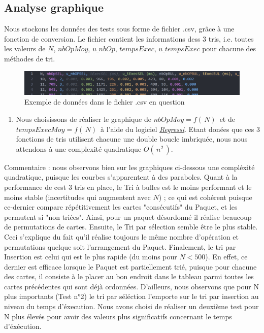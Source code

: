 \documentclass{report}
\begin{document}
\subsection{Analyse graphique}

\qquad Nous stockons les données des tests sous forme de fichier .csv, grâce à une fonction de conversion. Le fichier contient les informations dess 3 tris, i.e. toutes les valeurs de $N$, $nbOpMoy$, $u\_nbOp$, $tempsExec$, $u\_tempsExec$ pour chacune des méthodes de tri. 

\begin{figure}[H]
	\includegraphics[width=\textwidth]{../graphe/csvEx.png}
	\caption{Exemple de données dans le fichier .csv en question}
\end{figure}

\begin{enumerate}
	\item[\fcolorbox{black}{black}{\textbf{\textcolor{white}{3}}}] 
	Nous choisissons de réaliser le graphique de $nbOpMoy=f(\,N)\,$ et de $tempsExecMoy=f(\,N)\,$ à l'aide du logiciel \href{https://regressi.fr/WordPress/}{\it \underline{Regressi}}. Etant donées que ces 3 fonctions de tris utilisent chacune une double boucle imbriquée, nous nous attendons à une complexité quadratique $O(\,n^2\,)$.
\end{enumerate}
Commentaire : nous observons bien sur les graphiques ci-dessous une compléxité quadratique, puisque les courbes s'apparentent à des paraboles. Quant à la performance de cest 3 tris en place, le Tri à bulles est le moins performant et le moins stable (incertitudes qui augmentent avec $N$) ; ce qui est cohérent puisque ce-dernier compare répétitivement les cartes "consécutifs" du Paquet, et les permutent si "non triées". Ainsi, pour un paquet désordonné il réalise beaucoup de permutations de cartes. Ensuite, le Tri par sélection semble être le plus stable. Ceci s'explique du fait qu'il réalise toujours le même nombre d'opération et permutations quelque soit l'arrangement du Paquet. Finalement, le tri par Insertion est celui qui est le plus rapide (du moins pour $N<500$). En effet, ce dernier est efficace lorsque le Paquet est partiellement trié, puisque pour chacune des cartes, il consiste à le placer au bon endroit dans le tableau parmi toutes les cartes précédentes qui sont déjà ordonnées. D'ailleurs, nous observons que pour N plus importants (Test n°2) le tri par séléction l'emporte sur  le tri par insertion au niveau du temps d'éxecution. Nous avons choisi de réaliser un deuxième test pour N plus élevés pour avoir des valeurs plus significatifs concernant le temps d'éxécution.
\end{document}
